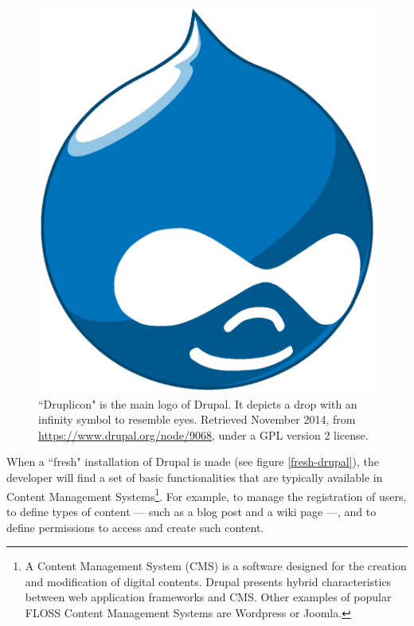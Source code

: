 \begin{figure}[H]
	\centering
	\includegraphics[scale=0.3]{img/druplicon.png}
	\caption[Druplicon: Drupal's logo]%
    {``Druplicon" is the main logo of Drupal. It depicts a drop with an infinity symbol to resemble eyes. Retrieved  November 2014, from \url{https://www.drupal.org/node/9068}, under a GPL version 2 license.}
	\label{druplicon}
\end{figure}

When a ``fresh" installation of Drupal is made (see figure \ref{fresh-drupal}), the developer will find a set of basic functionalities that are typically available in Content Management Systems\footnote{A Content Management System (CMS) is a software designed for the creation and modification of digital contents. Drupal presents hybrid characteristics between web application frameworks and CMS. Other examples of popular FLOSS Content Management Systems are Wordpress or Joomla.}. For example, to manage the registration of users, to define types of content --- such as a blog post and a wiki page ---, and to define permissions to access and create such content.

